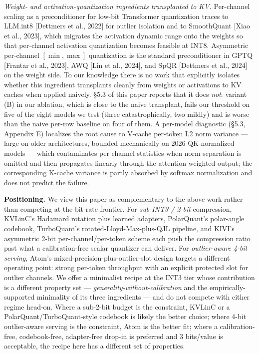 \documentclass[
]{article}
\begin{document}
\emph{Weight- and activation-quantization ingredients transplanted to
KV.} Per-channel scaling as a preconditioner for low-bit Transformer
quantization traces to LLM.int8 {[}Dettmers et al., 2022{]} for outlier
isolation and to SmoothQuant {[}Xiao et al., 2023{]}, which migrates the
activation dynamic range onto the weights so that per-channel activation
quantization becomes feasible at INT8. Asymmetric per-channel
\([\min, \max]\) quantization is the standard preconditioner in GPTQ
{[}Frantar et al., 2023{]}, AWQ {[}Lin et al., 2024{]}, and SpQR
{[}Dettmers et al., 2024{]} on the weight side. To our knowledge there
is no work that explicitly isolates whether this ingredient transplants
cleanly from weights or activations to KV caches when applied naively.
§5.3 of this paper reports that it does \emph{not}: variant (B) in our
ablation, which is close to the naive transplant, fails our threshold on
five of the eight models we test (three catastrophically, two mildly)
and is worse than the naive per-row baseline on four of them. A
per-model diagnostic (§5.3, Appendix E) localizes the root cause to
V-cache per-token L2 norm variance --- large on older architectures,
bounded mechanically on 2026 QK-normalized models --- which contaminates
per-channel statistics when norm separation is omitted and then
propagates linearly through the attention-weighted output; the
corresponding K-cache variance is partly absorbed by softmax
normalization and does not predict the failure.

\textbf{Positioning.} We view this paper as complementary to the above
work rather than competing at the bit-rate frontier. For \emph{sub-INT3
/ 2-bit} compression, KVLinC's Hadamard rotation plus learned adapters,
PolarQuant's polar-angle codebook, TurboQuant's
rotated-Lloyd-Max-plus-QJL pipeline, and KIVI's asymmetric 2-bit
per-channel/per-token scheme each push the compression ratio past what a
calibration-free scalar quantizer can deliver. For \emph{outlier-aware
4-bit serving}, Atom's mixed-precision-plus-outlier-slot design targets
a different operating point: strong per-token throughput with an
explicit protected slot for outlier channels. We offer a minimalist
recipe at the INT3 tier whose contribution is a different property set
--- \emph{generality-without-calibration} and the empirically-supported
minimality of its three ingredients --- and do not compete with either
regime head-on. Where a sub-2-bit budget is the constraint, KVLinC or a
PolarQuant/TurboQuant-style codebook is likely the better choice; where
4-bit outlier-aware serving is the constraint, Atom is the better fit;
where a calibration-free, codebook-free, adapter-free drop-in is
preferred and 3 bits/value is acceptable, the recipe here has a
different set of properties.
\end{document}
